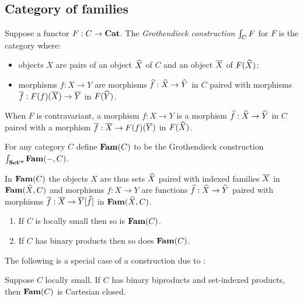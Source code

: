 \subsection{Category of families}
\label{sec:grothendieck}

\begin{definition}
Suppose a functor $F: C \to \mathbf{Cat}$. The \emph{Grothendieck construction} $\int_{C}F$ for $F$ is the
category where:
\begin{itemize}
\item objects $X$ are pairs of an object $\widehat{X}$ of $C$ and an object $\overline{X}$ of $F(\widehat{X})$;
\item morphisms $f: X \to Y$ are morphisms $\widehat{f}: \widehat{X} \to \widehat{Y}$ in $C$ paired with morphisms
$\overline{f}: F(f)(\overline{X}) \to \overline{Y}$ in $F(\widehat{Y})$.
\end{itemize}
\end{definition}

\noindent When $F$ is contravariant, a morphism $f: X \to Y$ is a morphism $\widehat{f}: \widehat{X} \to \widehat{Y}$ in
$C$ paired with a morphism $\overline{f}: \overline{X} \to F(f)(\overline{Y})$ in $F(\widehat{X})$.

\begin{definition}
For any category $C$ define $\mathbf{Fam}(C)$ to be the Grothendieck construction
$\int_{\mathbf{Set}^{\mathsf{op}}}\mathbf{Fam}(-,C)$.
\end{definition}

\noindent In $\mathbf{Fam}(C)$ the objects $X$ are thus sets $\widehat{X}$ paired with indexed families $\overline{X}$ in
$\mathbf{Fam}(\widehat{X},C)$ and morphisms $f: X \to Y$ are functions $\widehat{f}: \widehat{X} \to \widehat{Y}$ paired with
morphisms $\overline{f}: \overline{X} \to \overline{Y}[\widehat{f}]$ in $\mathbf{Fam}(\widehat{X},C)$.

\begin{proposition}
\item
\begin{enumerate}
\item If $C$ is locally small then so is $\mathbf{Fam}(C)$.
\item If $C$ has binary products then so does $\mathbf{Fam}(C)$.
\end{enumerate}
\end{proposition}

The following is a special case of a construction due to \citet{nunes2023}:

\begin{proposition}
Suppose $C$ locally small. If $C$ has binary biproducts and set-indexed products, then $\mathbf{Fam}(C)$ is Cartesian
closed.
\end{proposition}

